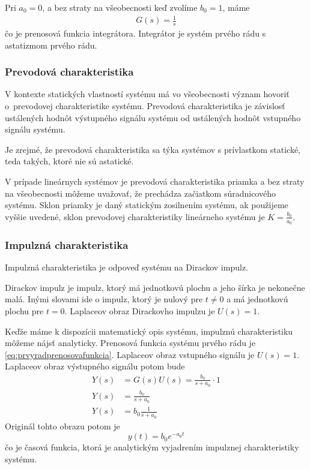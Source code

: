 \documentclass[a4paper, 10pt, ]{article}
\begin{document}
Pri $a_0 = 0$, a bez straty na všeobecnosti keď zvolíme $b_0 = 1$, máme
\begin{align}
    G(s) = \frac{1}{s}
\end{align}
čo je prenosová funkcia integrátora. Integrátor je systém prvého rádu s astatizmom prvého rádu.




\subsubsection{Prevodová charakteristika}

V kontexte statických vlastností systému má vo všeobecnosti význam hovoriť o~prevodovej charakteristike systému. Prevodová charakteristika je závislosť ustálených hodnôt výstupného signálu systému od ustálených hodnôt vstupného signálu systému.

Je zrejmé, že prevodová charakteristika sa týka systémov s prívlastkom statické, teda takých, ktoré nie sú astatické.

V prípade lineárnych systémov je prevodová charakteristika priamka a bez straty na všeobecnosti môžeme uvažovať, že prechádza začiatkom súradnicového systému. Sklon priamky je daný statickým zosilnením systému, ak použijeme vyššie uvedené, sklon prevodovej charakteristiky lineárneho systému je $K = \frac{b_0}{a_0}$.








\subsubsection{Impulzná charakteristika}

Impulzná charakteristika je odpoveď systému na Dirackov impulz.

\bigskip

Dirackov impulz je impulz, ktorý má jednotkovú plochu a jeho šírka je nekonečne malá. Inými slovami ide o impulz, ktorý je nulový pre $t \neq 0$ a má jednotkovú plochu pre $t = 0$. Laplaceov obraz Dirackovho impulzu je $U(s) = 1$.

Keďže máme k dispozícii matematický opis systému, impulznú charakteristiku môžeme nájsť analyticky. Prenosová funkcia systému prvého rádu je \eqref{eq:prvyradprenosovafunkcia}. Laplaceov obraz vstupného signálu je $U(s) = 1$. Laplaceov obraz výstupného signálu potom bude
\begin{subequations}
\begin{align}
    Y(s) &= G(s) U(s) = \frac{b_0}{s + a_0} \cdot 1 \\
    Y(s) &= \frac{b_0}{s + a_0} \\
    Y(s) &= b_0 \frac{1}{s + a_0}  
\end{align}
\end{subequations}
Originál tohto obrazu potom je
\begin{equation} \label{eq:ICH1R}
    y(t) = b_0 e^{-a_0 t} 
\end{equation}
čo je časová funkcia, ktorá je analytickým vyjadrením impulznej charakteristiky systému. 
\end{document}
